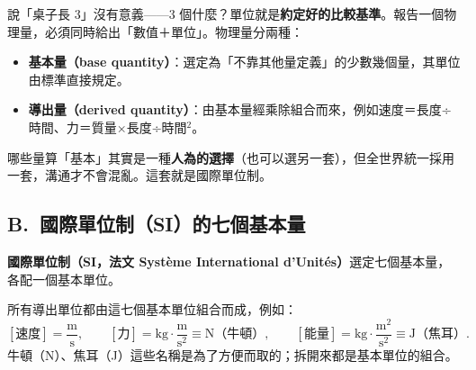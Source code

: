 \documentclass[11pt]{article}
\begin{document}
說「桌子長 3」沒有意義——3 個什麼？單位就是\textbf{約定好的比較基準}。報告一個物理量，必須同時給出「數值＋單位」。物理量分兩種：

\begin{itemize}\setlength{\itemsep}{1pt}
\item \textbf{基本量（base quantity）}：選定為「不靠其他量定義」的少數幾個量，其單位由標準直接規定。
\item \textbf{導出量（derived quantity）}：由基本量經乘除組合而來，例如速度＝長度÷時間、力＝質量×長度÷時間$^2$。
\end{itemize}

哪些量算「基本」其實是一種\textbf{人為的選擇}（也可以選另一套），但全世界統一採用一套，溝通才不會混亂。這套就是國際單位制。

\subsection*{\sffamily B.\ 國際單位制（SI）的七個基本量}

\textbf{國際單位制（SI，法文 Système International d'Unités）}選定七個基本量，各配一個基本單位。


所有導出單位都由這七個基本單位組合而成，例如：
$$[\text{速度}]=\frac{\text{m}}{\text{s}},\qquad
[\text{力}]=\text{kg}\cdot\frac{\text{m}}{\text{s}^2}\equiv\text{N（牛頓）},\qquad
[\text{能量}]=\text{kg}\cdot\frac{\text{m}^2}{\text{s}^2}\equiv\text{J（焦耳）}.$$
牛頓（N）、焦耳（J）這些名稱是為了方便而取的；拆開來都是基本單位的組合。
\end{document}

